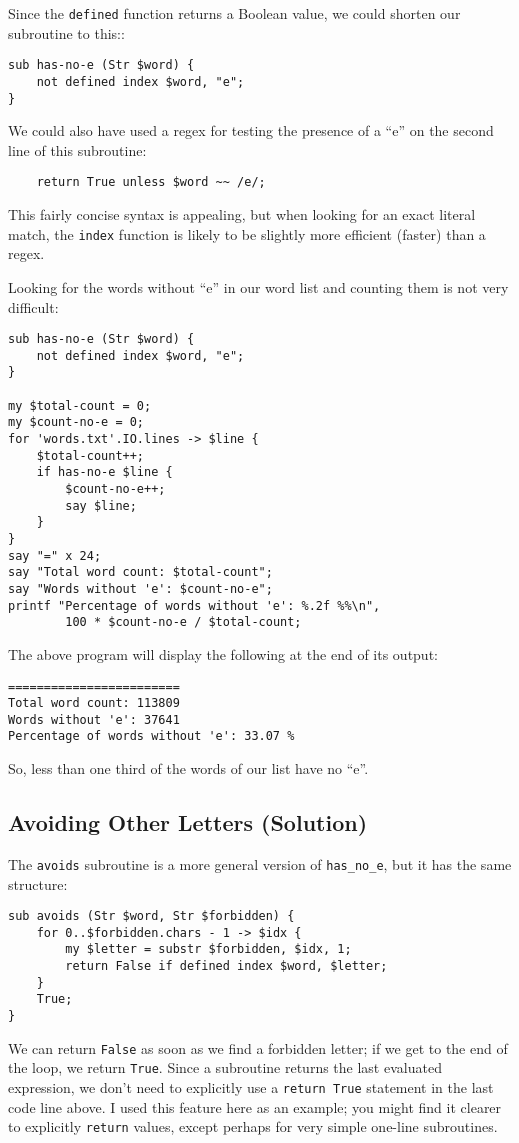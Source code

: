Since the {\tt defined} function returns a Boolean value, we 
could shorten our subroutine to this::
\begin{verbatim}
sub has-no-e (Str $word) {
    not defined index $word, "e";
}
\end{verbatim}
%

We could also have used a regex for testing the presence of a 
``e'' on the second line of this subroutine:

\begin{verbatim}
    return True unless $word ~~ /e/;
\end{verbatim}
%

This fairly concise syntax is appealing, but when 
looking for an exact literal match, the {\tt index} function 
is likely to be slightly more efficient (faster) than a 
regex.

Looking for the words without ``e'' in our word list and 
counting them is not very difficult:

\begin{verbatim}
sub has-no-e (Str $word) {
    not defined index $word, "e";
}

my $total-count = 0;
my $count-no-e = 0;
for 'words.txt'.IO.lines -> $line { 
    $total-count++;
    if has-no-e $line {
        $count-no-e++;
        say $line;
    }
}
say "=" x 24;
say "Total word count: $total-count";
say "Words without 'e': $count-no-e";
printf "Percentage of words without 'e': %.2f %%\n", 
        100 * $count-no-e / $total-count;
\end{verbatim}

The above program will display the following at the end 
of its output:

\begin{verbatim}
========================
Total word count: 113809
Words without 'e': 37641
Percentage of words without 'e': 33.07 %
\end{verbatim}

So, less than one third of the words of 
our list have no ``e''.

\subsection{Avoiding Other Letters (Solution)}

The {\tt avoids} subroutine is a more general version of 
\verb"has_no_e", but it has the same structure:

\begin{verbatim}
sub avoids (Str $word, Str $forbidden) {
    for 0..$forbidden.chars - 1 -> $idx {
        my $letter = substr $forbidden, $idx, 1;
        return False if defined index $word, $letter;
    }
    True;
}
\end{verbatim}
%
We can return {\tt False} as soon as we find a forbidden letter;
if we get to the end of the loop, we return {\tt True}. Since 
a subroutine returns the last evaluated expression, we don't 
need to explicitly use a {\tt return True} statement in the last 
code line above. I used this feature here as an example; you might 
find it clearer to explicitly {\tt return} values, except 
perhaps for very simple one-line subroutines.

